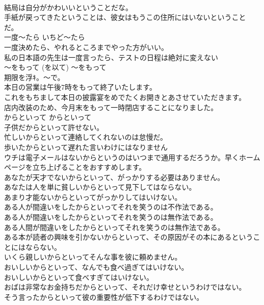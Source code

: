 \documentclass[8pt]{extreport}
\begin{document}
\begin{CJK}{UTF8}{min}
\\	結局は自分がかわいいということだな。   
\\	手紙が戻ってきたということは、彼女はもうこの住所にはいないということだ。  
\\	一度〜たら	いちど〜たら	
\\	一度決めたら、やれるところまでやった方がいい。  
\\	私の日本語の先生は一度言ったら、テストの日程は絶対に変えない  
\\	〜をもって (を以て)	〜をもって	
\\	期限を浮ｷ。〜で。	
\\	本日の営業は午後7時をもって終了いたします。  
\\	これをもちまして本日の披露宴をめでたくお開きとあさせていただきます。   
\\	店内改装のため、今月末をもって一時閉店することになりました。  
\\	からといって	からといって	
\\	子供だからといって許せない。  
\\	忙しいからといって連絡してくれないのは怠慢だ。  
\\	歩いたからといって遅れた言いわけにはなりません  
\\	ウチは電子メールはないからというのはいつまで通用するだろうか。早くホームページを立ち上げることをおすすめします。  
\\	あなたが天才でないからといって、がっかりする必要はありません。   
\\	あなたは人を単に貧しいからといって見下してはならない。   
\\	あまり才能ないからといってがっかりしてはいけない。   
\\	ある人が間違いをしたからといってそれを笑うのは不作法である。   
\\	ある人が間違いをしたからといってそれを笑うのは無作法である。   
\\	ある人間が間違いをしたからといってそれを笑うのは無作法である。   
\\	ある本が読者の興味を引かないからといって、その原因がその本にあるということにはならない。   
\\	いくら親しいからといってそんな事を彼に頼めません。   
\\	おいしいからといって、なんでも食べ過ぎてはいけない。   
\\	おいしいからといって食べすぎてはいけない。   
\\	おばは非常なお金持ちだからといって、それだけ幸せというわけではない。   
\\	そう言ったからといって彼の重要性が低下するわけではない。   

\end{CJK}
\end{document}
